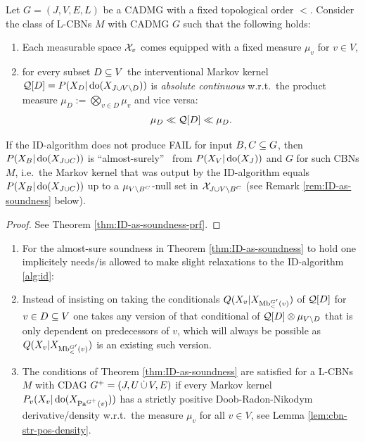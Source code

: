 \begin{Thm}
    \label{thm:ID-as-soundness}
    Let $G=(J,V,E,L)$ be a CADMG with a fixed topological order $<$. 
    Consider the class of L-CBNs $M$ with \observational CADMG $G$ such that the following holds: 
    \begin{enumerate}
        \item Each measurable space $\mathcal{X}_v$ comes equipped with a fixed measure $\mu_v$ for $v \in V$,
        \item for every subset $D \subseteq V$ the interventional Markov kernel $\mathcal{Q}[D]=P(X_D|\operatorname{do}(X_{J \cup V \setminus D}))$ is
            \emph{absolute continuous} w.r.t.\ the product measure $\mu_D:=\bigotimes_{v \in D} \mu_v$ and vice versa:
            \[ \mu_D \ll \mathcal{Q}[D] \ll \mu_D.   \]
    \end{enumerate}
    If the ID-algorithm does not produce FAIL for input $B, C \subseteq G$,
    then $P(X_B|\operatorname{do}(X_{J \cup C}))$ is ``almost-surely'' \trackable\ from $P(X_V|\operatorname{do}(X_J))$ and $G$ for such CBNs $M$, 
    i.e.\ the Markov kernel that was output by the ID-algorithm equals $P(X_B|\operatorname{do}(X_{J \cup C}))$ up to a
    $\mu_{V\setminus B^C}$-null set in $\mathcal{X}_{J \cup V\setminus B^C}$ (see Remark \ref{rem:ID-as-soundness} below).
    \begin{proof}
        See Theorem \ref{thm:ID-as-soundness-prf}.
    \end{proof}
\end{Thm}

\begin{Rem}
    \label{rem:ID-as-soundness}
    \begin{enumerate}
        \item For the almost-sure soundness in Theorem \ref{thm:ID-as-soundness} to hold one implicitely needs/is allowed
            to make slight relaxations to the ID-algorithm \ref{alg:id}: 
        \item[] Instead of insisting on taking the conditionals $Q(X_v|X_{\mathrm{Mb}^{G'}_<(v)})$ 
            of $\mathcal{Q}[D]$ for $v \in D \subseteq V$ one takes any version of that conditional of $\mathcal{Q}[D]\otimes \mu_{V \setminus D}$ 
            that is only dependent on predecessors of $v$, 
            which will always be possible as $Q(X_v|X_{\mathrm{Mb}^{G'}_<(v)})$ is an existing such version.
        \item The conditions of Theorem \ref{thm:ID-as-soundness} are satisfied for a L-CBNs $M$ with CDAG
            $G^+=(J, U \,\dot{\cup}\, V,E)$ if every Markov kernel $P_v(X_v|\operatorname{do}(X_{\mathrm{Pa}^{G^+}(v)}))$ has a strictly positive Doob-Radon-Nikodym derivative/density w.r.t.\ the measure $\mu_v$ for all $v \in V$, see Lemma \ref{lem:cbn-str-pos-density}.
    \end{enumerate}
\end{Rem}

